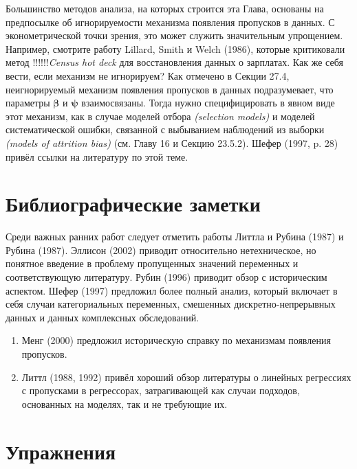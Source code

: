 Большинство методов анализа, на которых строится эта Глава, основаны на предпосылке об игнорируемости механизма появления пропусков в данных. С эконометрической точки зрения, это может служить значительным упрощением. Например, смотрите работу Lillard, Smith и Welch (1986), которые критиковали метод !!!!!!\emph{Census hot deck} для восстановления данных о зарплатах. Как же себя вести, если механизм не игнорируем? Как отмечено в Секции 27.4, неигнорируемый механизм появления пропусков в данных подразумевает, что параметры $\mathbf{\beta}$ и $\mathbf{\psi}$ взаимосвязаны. Тогда нужно специфицировать в явном виде этот механизм, как в случае моделей отбора \emph{(selection models)} и моделей систематической ошибки, связанной с выбыванием наблюдений из выборки \emph{(models of attrition bias)} (см. Главу 16 и Секцию 23.5.2). Шефер (1997, p. 28) привёл ссылки на литературу по этой теме.

\section{Библиографические заметки}
Среди важных ранних работ следует отметить работы Литтла и Рубина (1987) и Рубина (1987). Эллисон (2002) приводит относительно нетехническое, но понятное введение в проблему пропущенных значений переменных и соответствующую литературу. Рубин (1996) приводит обзор с историческим аспектом. Шефер (1997) предложил более полный анализ, который включает в себя случаи категориальных переменных, смешенных дискретно-непрерывных данных и данных комплексных обследований.
\begin{enumerate}
\item Менг (2000) предложил историческую справку по механизмам появления пропусков.
\item Литтл (1988, 1992) привёл хороший обзор литературы о линейных регрессиях с пропусками в регрессорах, затрагивающей как случаи подходов, основанных на моделях, так и не требующие их.
\end{enumerate}

\section*{Упражнения} 

